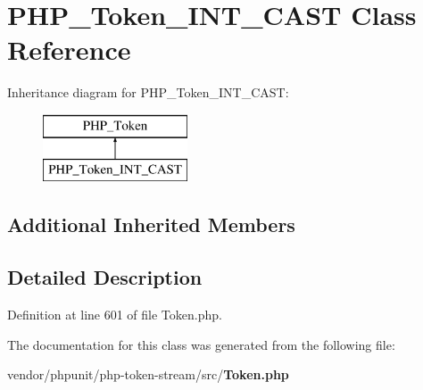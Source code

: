 \section{P\+H\+P\+\_\+\+Token\+\_\+\+I\+N\+T\+\_\+\+C\+A\+S\+T Class Reference}
\label{class_p_h_p___token___i_n_t___c_a_s_t}
Inheritance diagram for P\+H\+P\+\_\+\+Token\+\_\+\+I\+N\+T\+\_\+\+C\+A\+S\+T\+:\begin{figure}[H]
\begin{center}
\leavevmode
\includegraphics[height=2.000000cm]{class_p_h_p___token___i_n_t___c_a_s_t}
\end{center}
\end{figure}
\subsection*{Additional Inherited Members}


\subsection{Detailed Description}


Definition at line 601 of file Token.\+php.



The documentation for this class was generated from the following file\+:\begin{DoxyCompactItemize}
\item 
vendor/phpunit/php-\/token-\/stream/src/{\bf Token.\+php}\end{DoxyCompactItemize}
